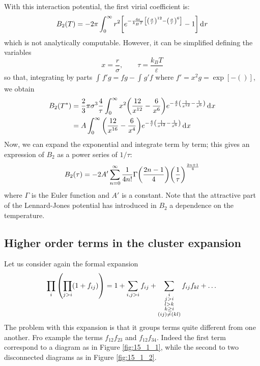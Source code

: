 \documentclass[../../Main/Main.tex]{subfiles}
\begin{document}
With this interaction potential, the first virial coefficient is:
\begin{equation*}
  B_2 (T) = - 2 \pi \int_{0}^{\infty } r^2 \qty[e^{- \frac{4 \varepsilon }{k_B T} \qty[\qty(\frac{\sigma }{r})^{12} - \qty(\frac{\sigma }{r})^6] } -1] \dd[]{r}
\end{equation*}
which is not analytically computable. However, it can be simplified defining the variables
\begin{equation*}
  x = \frac{r}{\sigma }, \qquad \tau = \frac{k_B T}{\varepsilon }
\end{equation*}
 so that, integrating by parts \( \int_{}^{} f' g = fg - \int_{}^{} g' f    \) where \( f' = x^2 g = \exp [-()]   \), we obtain
\begin{equation*}
\begin{split}
  B_2 (T^*) &= \frac{2}{3} \pi \sigma ^3 \frac{4}{\tau } \int_{0}^{\infty } x^2  \qty(\frac{12}{x^{12}}- \frac{6}{x^6}) e^{- \frac{4}{\tau } \qty(\frac{1}{x^{12}} - \frac{1}{x^6}) }  \dd[]{x}  \\
  & = A \int_{0}^{\infty } \qty(\frac{12}{x^{16}}- \frac{6}{x^4}) e^{- \frac{4}{\tau } \qty(\frac{1}{x^{12}} - \frac{1}{x^6}) } \dd[]{x}
\end{split}
\end{equation*}
Now, we can expand the exponential and integrate term by term; this gives an expression of \( B_2 \) as a power series of \( 1/\tau  \):
\begin{equation}
  B_2 (\tau ) = - 2 A' \sum_{n=0}^{\infty } \frac{1}{4n!} \Gamma \qty(\frac{2n-1}{4}) \qty(\frac{1}{\tau })^{\frac{2n+1}{4}}
\end{equation}
where \( \Gamma  \) is the Euler function and \( A' \) is a constant.  Note that the attractive part of the Lennard-Jones potential has introduced in \( B_2 \) a dependence on the temperature.





\subsection{Higher order terms in the cluster expansion}
Let us consider again the formal expansion
\begin{equation*}
  \prod_{i}^{} \qty(\prod_{j>i}^{} (1+f_{ij}) ) = 1 + \sum_{i,j>i}^{} f_{ij}
  + \sum_{\substack{ i \\ j>i \\ l>k \\ k \ge i \\ (ij) \neq (kl)} }^{} f_{ij} f_{kl}     + \dots
\end{equation*}
The problem with this expansion is that it groups terms quite different from one another. Fro example the terms \( f_{12}f_{23} \) and \( f_{12}f_{34} \). Indeed the first term correspond to a diagram as in Figure \ref{fig:15_1_1}, while the second to two disconnected diagrams as in Figure \ref{fig:15_1_2}.
\end{document}
